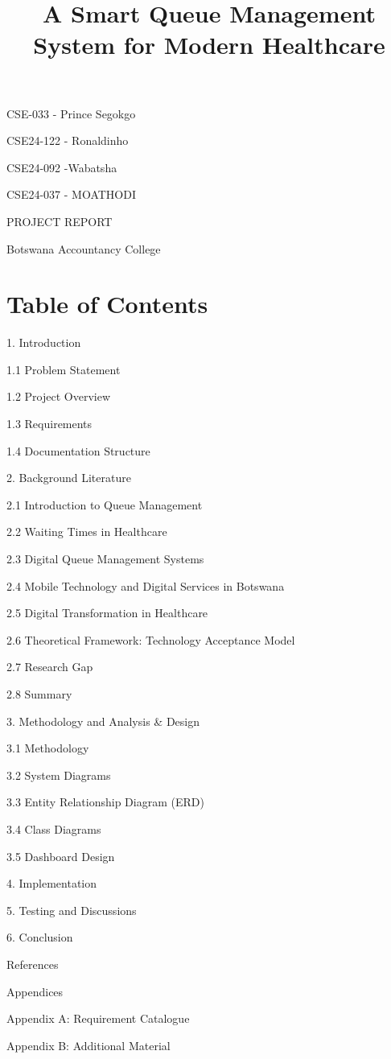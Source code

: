 \documentclass[
]{article}
\title{A Smart Queue Management System for Modern Healthcare}
\author{}
\date{}
\begin{document}
\maketitle
CSE-033 - Prince Segokgo

 CSE24-122 - Ronaldinho

CSE24-092 -Wabatsha

 CSE24-037 - MOATHODI

 
PROJECT REPORT

Botswana Accountancy College

\section{Table of Contents}\label{table-of-contents}

1. Introduction

1.1 Problem Statement

1.2 Project Overview

1.3 Requirements

1.4 Documentation Structure

2. Background Literature

2.1 Introduction to Queue Management

2.2 Waiting Times in Healthcare

2.3 Digital Queue Management Systems

2.4 Mobile Technology and Digital Services in Botswana

2.5 Digital Transformation in Healthcare

2.6 Theoretical Framework: Technology Acceptance Model

2.7 Research Gap

2.8 Summary

3. Methodology and Analysis \& Design

3.1 Methodology

3.2 System Diagrams

3.3 Entity Relationship Diagram (ERD)

3.4 Class Diagrams

3.5 Dashboard Design

4. Implementation

5. Testing and Discussions

6. Conclusion

References

Appendices

Appendix A: Requirement Catalogue

Appendix B: Additional Material
\end{document}
